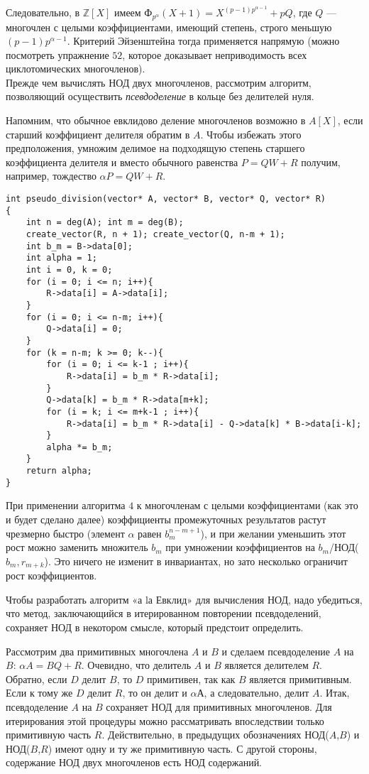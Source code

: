 \documentclass{mai_book}
\begin{document}
\pagebreak

\noindent Следовательно, в $\mathbb{Z}[X]$ имеем Ф$_{p^ \alpha}(X+1) = X^{(p-1)p^{\alpha -1}}+pQ$, где $Q$ —
многочлен с целыми коэффициентами, имеющий степень, строго 
меньшую $(p-1)p^{\alpha -1}$. Критерий Эйзенштейна тогда применяется 
напрямую (можно посмотреть упражнение $52$, которое доказывает 
неприводимость всех циклотомических многочленов).
\\

Прежде чем вычислять НОД двух многочленов, рассмотрим 
алгоритм, позволяющий осуществить \textit{псевдоделение} в кольце без делителей
нуля.

Напомним, что обычное евклидово деление многочленов возможно
в $A[X]$, если старший коэффициент делителя обратим в $A$. Чтобы 
избежать этого предположения, умножим делимое на подходящую 
степень старшего коэффициента делителя и вместо обычного равенства
$P = QW+R$ получим, например, тождество $\alpha P = QW+R$.

\begin{lstlisting}
int pseudo_division(vector* A, vector* B, vector* Q, vector* R)
{
    int n = deg(A); int m = deg(B);
    create_vector(R, n + 1); create_vector(Q, n-m + 1);
    int b_m = B->data[0];
    int alpha = 1;
    int i = 0, k = 0;
    for (i = 0; i <= n; i++){
        R->data[i] = A->data[i];
    }
    for (i = 0; i <= n-m; i++){
        Q->data[i] = 0;
    }
    for (k = n-m; k >= 0; k--){
        for (i = 0; i <= k-1 ; i++){
            R->data[i] = b_m * R->data[i];
        }
        Q->data[k] = b_m * R->data[m+k];
        for (i = k; i <= m+k-1 ; i++){
            R->data[i] = b_m * R->data[i] - Q->data[k] * B->data[i-k];
        }
        alpha *= b_m;
    }
    return alpha;
}
\end{lstlisting}

При применении алгоритма $4$ к многочленам с целыми 
коэффициентами (как это и будет сделано далее) коэффициенты 
промежуточных результатов растут чрезмерно быстро (элемент $\alpha$ равен $b_m^{n-m+1}$), и при желании уменьшить этот рост можно заменить множитель $b_m$ при умножении коэффициентов на $b_m$/НОД($b_m, r_{m+k}$). Это ничего не
изменит в инвариантах, но зато несколько ограничит рост 
коэффициентов.

Чтобы разработать алгоритм «а lа Евклид» для вычисления НОД,
надо убедиться, что метод, заключающийся в итерированном повторении псевдоделений, сохраняет НОД в некотором смысле, который
предстоит определить.

Рассмотрим два примитивных многочлена $A$ и $B$ и сделаем 
псевдоделение $A$ на $B$: $\alpha A=BQ+R$. Очевидно, что делитель $A$ и $B$ является делителем $R$. Обратно, если $D$ делит $B$, то $D$ примитивен, так как $B$ является примитивным. Если к тому же $D$ делит $R$, то он делит и
$\alpha А$, а следовательно, делит $A$. Итак, псевдоделение $A$ на $B$ сохраняет НОД для примитивных многочленов. Для итерирования этой 
процедуры можно рассматривать впоследствии только примитивную часть $R$.
Действительно, в предыдущих обозначениях НОД($A$,$B$) и НОД($B$,$R$)
имеют одну и ту же примитивную часть. С другой стороны, 
содержание НОД двух многочленов есть НОД содержаний.
\end{document}
